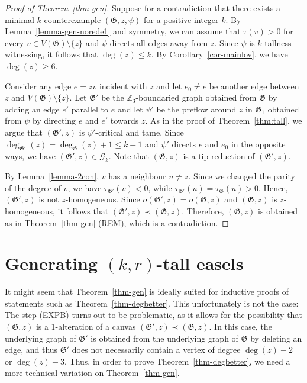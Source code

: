 \documentclass{article}
\newcommand{\Z}{\mathbb{Z}_3}
\newcommand{\GG}{\mathcal{G}}
\newcommand\g{\mathfrak{G}}
\begin{document}
\begin{proof}[Proof of Theorem~\ref{thm-gen}]
Suppose for a contradiction that there exists a minimal $k$-counterexample $(\g,z,\psi)$ for a positive integer $k$.
By Lemma~\ref{lemma-gen-norede1} and symmetry, we can assume that $\tau(v)>0$ for every $v\in V(\g)\setminus\{z\}$ and $\psi$ directs all edges away from $z$.
Since $\psi$ is $k$-tallness-witnessing, it follows that $\deg(z)\le k$.  By Corollary~\ref{cor-mainlov}, we have $\deg(z)\ge 6$.

Consider any edge $e=zv$ incident with $z$ and let $e_0\neq e$ be another edge between $z$ and $V(\g)\setminus \{z\}$.
Let $\g'$ be the $\Z$-boundaried graph obtained from $\g$ by adding
an edge $e'$ parallel to $e$ and let $\psi'$ be the preflow around $z$ in $\g_1$ obtained from $\psi$ by
directing $e$ and $e'$ towards $z$.  As in the proof of Theorem~\ref{thm:tall}, we argue that $(\g',z)$ is $\psi'$-critical and tame.
Since $\deg_{\g'}(z)=\deg_{\g}(z)+1\le k+1$ and $\psi'$ directs $e$ and $e_0$ in the opposite ways, we have $(\g',z)\in\GG_k$.
Note that $(\g,z)$ is a tip-reduction of $(\g',z)$.

By Lemma~\ref{lemma-2con}, $v$ has a neighbour $u \neq z$.  Since we changed the parity of the degree of $v$, we have $\tau_{\g'}(v)<0$, while $\tau_{\g'}(u)=\tau_{\g}(u)>0$.
Hence, $(\g',z)$ is not $z$-homogeneous.  Since $o(\g',z)=o(\g,z)$ and $(\g,z)$ is $z$-homogeneous, it follows that $(\g',z)\prec (\g,z)$.
Therefore, $(\g,z)$ is obtained as in Theorem~\ref{thm-gen} (REM), which is a contradiction.
\end{proof}




\section{Generating $(k,r)$-tall easels}\label{sec:geneasels}


It might seem that Theorem~\ref{thm-gen} is ideally suited for inductive proofs of statements such as Theorem~\ref{thm-degbetter}.
This unfortunately is not the case: The step (EXPB) turns out to be problematic, as it allows for the possibility that $(\g,z)$ is a 1-alteration of a canvas $(\g',z)\prec (\g,z)$. In this case, the underlying graph of $\g'$ is obtained from the underlying graph of $\g$ by deleting an edge, and thus $\g'$ does not necessarily contain a vertex of degree $\deg(z)-2$ or $\deg(z)-3$.  Thus, in order to prove Theorem~\ref{thm-degbetter}, we need a more technical variation on Theorem~\ref{thm-gen}.
\end{document}
